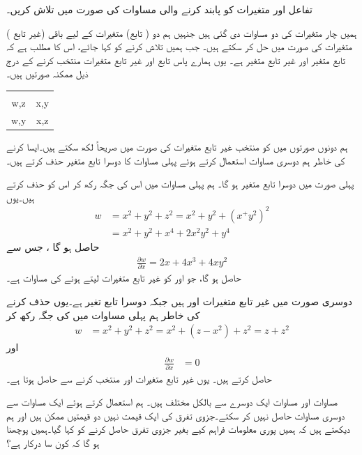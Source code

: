 تفاعل  اور متغیرات کو پابند کرنے والی مساوات  کی صورت میں  تلاش کریں۔

ہمیں چار متغیرات کی دو مساوات دی گئی ہیں جنہیں ہم دو ( تابع)  متغیرات کے لیے  باقی (غیر تابع ) متغیرات کی صورت میں  حل کر سکتے ہیں۔ جب ہمیں  تلاش کرنے کو کہا جائے،  اس کا مطلب ہے کہ  تابع متغیر اور  غیر  تابع متغیر ہے۔ یوں ہمارے پاس تابع اور غیر تابع متغیرات منتخب کرنے کے درج ذیل ممکنہ صورتیں  ہیں۔
\begin{center}
\begin{tabular}{CC}
&\\
w,z&x,y\\
w,y&x,z
\end{tabular}
\end{center}
ہم دونوں صورتوں میں    کو منتخب غیر تابع متغیرات کی صورت میں  صریحاً لکھ سکتے ہیں۔ایسا کرنے کی خاطر ہم دوسری مساوات   استعمال کرتے ہوئے پہلی مساوات کا    دوسرا تابع متغیر   حذف کرتے ہیں۔ 

پہلی صورت  میں  دوسرا تابع متغیر ہو گا۔ ہم پہلی مساوات میں اس کی جگہ  رکھ کر  اس کو حذف  کرتے ہیں۔یوں
\begin{align*}
w&=x^2+y^2+z^2=x^2+y^2+(x^+y^2)^2\\
&=x^2+y^2+x^4+2x^2y^2+y^4
\end{align*}
حاصل ہو گا ، جس سے
\begin{align}\label{مساوات_کثیرالمتغیر_پہلا_جواب}
\frac{\partial w}{\partial x}=2x+4x^3+4xy^2
\end{align}
 حاصل ہو گا،  جو   اور   کو غیر تابع متغیرات لیتے ہوئے  کی مساوات ہے۔

دوسری   صورت  میں غیر تابع متغیرات  اور  ہیں جبکہ دوسرا تابع تغیر  ہے۔یوں  حذف  کرنے کی خاطر ہم پہلی مساوات میں  کی جگہ   رکھ کر
\begin{align*}
w&=x^2+y^2+z^2=x^2+(z-x^2)+z^2=z+z^2
\end{align*}
اور
\begin{align}\label{مساوات_کثیرالمتغیر_دوسرا_جواب}
\tfrac{\partial w}{\partial x}&=0
\end{align}
حاصل کرتے ہیں۔ یوں  غیر تابع متغیرات  اور  منتخب کرنے سے  حاصل ہوتا ہے۔

مساوات  اور مساوات  ایک دوسرے سے بالکل مختلف ہیں۔ ہم  استعمال کرتے ہوئے ایک مساوات  سے دوسری مساوات حاصل نہیں کر سکتے۔جزوی تفرق   کی ایک قیمت  نہیں دو قیمتیں ممکن ہیں اور ہم دیکھتے ہیں کہ ہمیں   پوری معلومات فراہم کیے بغیر  جزوی تفرق حاصل کرنے کو کہا گیا۔ہمیں پوچھنا ہو گا کہ کون سا  درکار ہے؟

